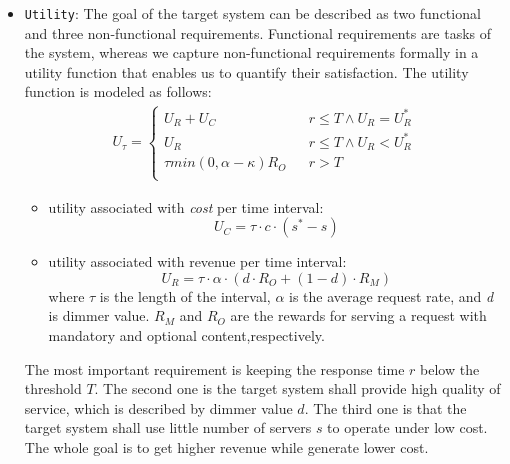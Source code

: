 \documentclass[sigconf]{acmart}
\begin{document}
\begin{itemize}
\begin{itemize}
	\end{itemize}
	\item {\verb|Utility|}:
	The goal of the target system can be described as two functional and three non-functional requirements. Functional requirements are tasks of the system, whereas we capture non-functional requirements formally in a utility function that enables us to quantify their satisfaction. The utility function is modeled as follows:
	\begin{equation}
	\begin{aligned}
	U_{\tau}=\left\{
	\begin{array}{rcl}
	U_{R}+U_{C} & & { r\leq T\wedge U_{R}=U_{R}^{*}} \\
	U_{R} & & {r\leq T\wedge U_{R}<U_{R}^{*}}\\
	\tau min(0,\alpha-\kappa)R_{O} & & {r>T}\\
	\end{array} \right.
	\end{aligned}
	\end{equation}
	\begin{itemize}
		\item utility associated with \textit{cost }per time interval:
		\begin{equation}
		U_{C}=\tau \cdot c\cdot (s^{*}-s)
		\end{equation}
		\item utility associated with revenue per time interval:
		\begin{equation}
		U_{R}=\tau \cdot \alpha \cdot (d\cdot R_{O}+(1-d)\cdot R_{M})
		\end{equation}
		where $\tau$ is the length of the interval, $\alpha$ is the average request rate, and \textit{d} is dimmer value. $R_{M}$ and $R_{O}$ are the rewards for serving a request with mandatory and optional content,respectively.
	\end{itemize}
	The most important requirement is keeping the response time $r$ below the threshold $T$. The second one is the target system shall provide high quality of service, which is described by dimmer value $d$. The third one is that the target system shall use little number of servers $s$ to operate under low cost. The whole goal is to get higher revenue while generate lower cost.
\end{itemize}
\end{document}
